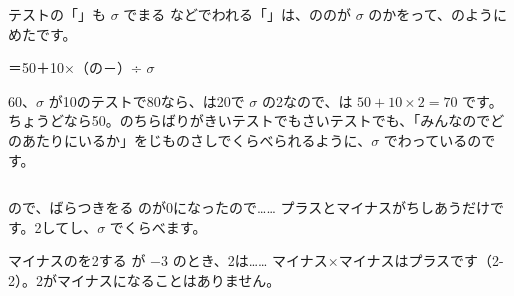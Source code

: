 \begin{column}{テストの「」も $\sigma$ でまる}
などでわれる「」は、ののが $\sigma$ のかをって、のようにめたです。
\begin{center}
＝50＋10×（の－）÷ $\sigma$
\end{center}
60、$\sigma$ が10のテストで80なら、は20で $\sigma$ の2なので、は $50+10\times2=70$ です。ちょうどなら50。のちらばりがきいテストでもさいテストでも、「みんなのでどのあたりにいるか」をじものさしでくらべられるように、$\sigma$ でわっているのです。
\end{column}


\noindent\begin{minipage}[t]{0.485\linewidth}\vspace{0pt}\raggedright
\begin{tsumazuki}{ので、ばらつきをる}
のが0になったので……
プラスとマイナスがちしあうだけです。2してし、$\sigma$ でくらべます。
\end{tsumazuki}
\end{minipage}\hfill
\begin{minipage}[t]{0.485\linewidth}\vspace{0pt}\raggedright
\begin{tsumazuki}{マイナスのを2する}
が $-3$ のとき、2は……
マイナス×マイナスはプラスです（2-2）。2がマイナスになることはありません。
\end{tsumazuki}
\end{minipage}

